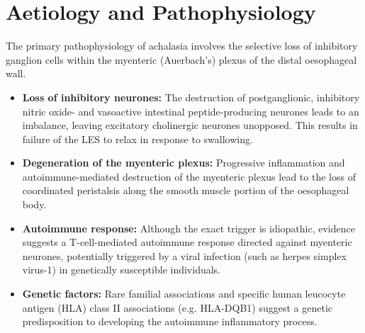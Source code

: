 \section*{Aetiology and Pathophysiology}
The primary pathophysiology of achalasia involves the selective loss of inhibitory ganglion cells within the myenteric (Auerbach's) plexus of the distal oesophageal wall.
\begin{itemize}
    \item \textbf{Loss of inhibitory neurones:} The destruction of postganglionic, inhibitory nitric oxide- and vasoactive intestinal peptide-producing neurones leads to an imbalance, leaving excitatory cholinergic neurones unopposed. This results in failure of the LES to relax in response to swallowing.
    \item \textbf{Degeneration of the myenteric plexus:} Progressive inflammation and autoimmune-mediated destruction of the myenteric plexus lead to the loss of coordinated peristalsis along the smooth muscle portion of the oesophageal body.
    \item \textbf{Autoimmune response:} Although the exact trigger is idiopathic, evidence suggests a T-cell-mediated autoimmune response directed against myenteric neurones, potentially triggered by a viral infection (such as herpes simplex virus-1) in genetically susceptible individuals.
    \item \textbf{Genetic factors:} Rare familial associations and specific human leucocyte antigen (HLA) class II associations (e.g. HLA-DQB1) suggest a genetic predisposition to developing the autoimmune inflammatory process.
\end{itemize}

